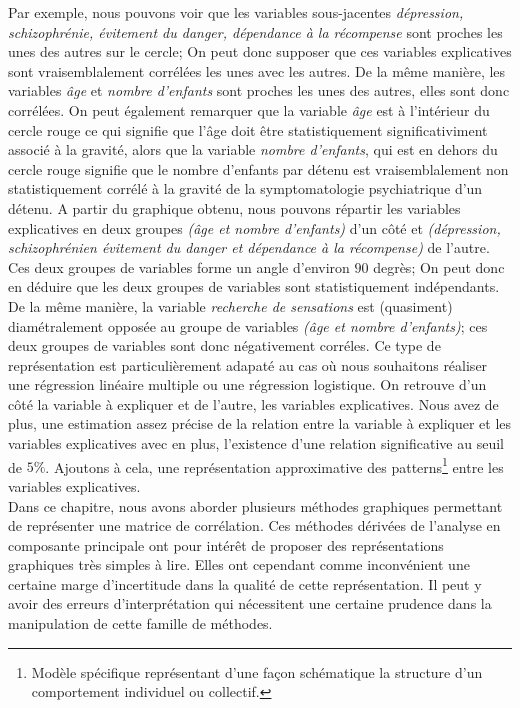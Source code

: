 Par exemple, nous pouvons voir que les variables sous-jacentes \textit{dépression, schizophrénie, évitement du danger, dépendance à la récompense} sont proches les unes des autres sur le cercle; On peut donc supposer que ces variables explicatives sont vraisemblalement corrélées les unes avec les autres.\newline
De la même manière, les variables \textit{âge} et \textit{nombre d'enfants} sont proches les unes des autres, elles sont donc corrélées. On peut également remarquer que la variable \textit{âge} est à l'intérieur du cercle rouge ce qui signifie que l'âge doit être statistiquement significativiment associé à la gravité, alors que la variable \textit{nombre d'enfants}, qui est en dehors du cercle rouge signifie que le nombre d'enfants par détenu est vraisemblalement non statistiquement corrélé à la gravité de la symptomatologie psychiatrique d'un détenu.\newline
A partir du graphique obtenu, nous pouvons répartir les variables explicatives en deux groupes \textit{(âge et nombre d'enfants)} d'un côté et \textit{(dépression, schizophrénien évitement du danger et dépendance à la récompense)} de l'autre. Ces deux groupes de variables forme un angle d'environ $90$ degrès; On peut donc en déduire que les deux groupes de variables sont statistiquement indépendants.\newline
De la même manière, la variable \textit{recherche de sensations} est (quasiment) diamétralement opposée au groupe de variables \textit{(âge et nombre d'enfants)}; ces deux groupes de variables sont donc négativement corréles.\newline
Ce type de représentation est particulièrement adapaté au cas où nous souhaitons réaliser une régression linéaire multiple ou une régression logistique.\newline
On retrouve d'un côté la variable à expliquer et de l'autre, les variables explicatives. Nous avez de plus, une estimation assez précise de la relation entre la variable à expliquer et les variables explicatives avec en plus, l'existence d'une relation significative au seuil de $5\%$. Ajoutons à cela, une représentation approximative des patterns\footnote{Modèle spécifique représentant d'une façon schématique la structure d'un comportement individuel ou collectif.} entre les variables explicatives.\newline
\\
Dans ce chapitre, nous avons aborder plusieurs méthodes graphiques permettant de représenter une matrice de corrélation. Ces méthodes dérivées de l'analyse en composante principale ont pour intérêt de proposer des représentations graphiques très simples à lire. Elles ont cependant comme inconvénient une certaine marge d'incertitude dans la qualité de cette représentation. Il peut y avoir des erreurs d'interprétation qui nécessitent une certaine prudence dans la manipulation de cette famille de méthodes.

